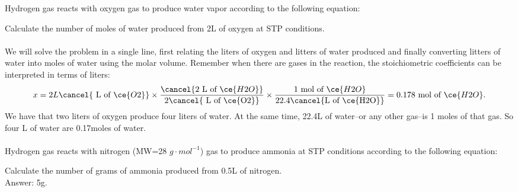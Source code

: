 \documentclass[main.tex]{subfiles}
\begin{document}
\begin{description}
\begin{example} %
Hydrogen gas reacts with oxygen gas to produce water vapor according to the following equation:
\begin{center} \end{center}
Calculate the number of moles of water produced from 2L of oxygen at STP conditions.
\\
\\
We will solve the problem in a single line, first relating the liters of oxygen and litters of water produced and finally converting litters of water into moles of water using the molar volume. Remember when there are gases in the reaction, the stoichiometric coefficients can be interpreted in terms of liters:
\begin{equation*}
x=2L\cancel{\text{ L of }\ce{O2}} \times \dfrac{\cancel{\text{2 L of }\ce{H2O}}}{2\cancel{\text{ L of \ce{O2}}}} \times   \dfrac{\text{1 mol of }\ce{H2O}}{22.4 \cancel{\text{L of \ce{H2O}}}}      =0.178\text{ mol of }\ce{H2O}.
\end{equation*}
We have that two liters of oxygen produce four liters of water. At the same time, 22.4L of water--or any other gas--is 1 moles of that gas. So four L of water are 0.17moles of water.
\\
\faDiamond\ \\
Hydrogen gas reacts with nitrogen (MW=28 $g\cdot mol^{-1}$) gas to produce ammonia at STP conditions according to the following equation:
\begin{center} \end{center}
Calculate the number of grams of ammonia produced from 0.5L of nitrogen.
\\
\flushright Answer: 5g.
\end{example}%
\end{description}
\end{document}
